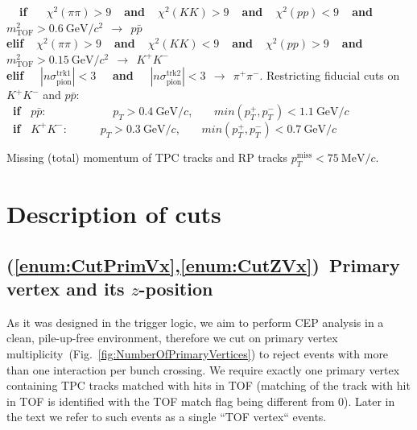 \begin{enumerate}[label=\textbf{C\arabic*},ref=C\arabic*]
\begin{enumerate}[label=\textbf{\theenumi.\arabic*},ref=\theenumi.\arabic*]
        \textbf{~~if~~~}\hspace*{4.5pt}$\chi^{2}(\pi\pi)>9$\textbf{~~and~~}$\chi^{2}(KK)>9$\textbf{~~and~~}$\chi^{2}(pp)<9$\textbf{~~and~~}$m^{2}_{\text{TOF}}>0.6~\text{GeV}/c^{2}~~\rightarrow~~p\bar{p}$\\[5pt]%
        \textbf{elif~~}$\chi^{2}(\pi\pi)>9$\textbf{~~and~~}$\chi^{2}(KK)<9$\textbf{~~and~~}$\chi^{2}(pp)>9$\textbf{~~and~~}$m^{2}_{\text{TOF}}>0.15~\text{GeV}/c^{2}~~\rightarrow~~K^{+}K^{-}$\\[5pt]%
        \textbf{elif~~} $|n\sigma_{\text{pion}}^{\text{trk1}}|<3$ \textbf{~~and~~} $|n\sigma_{\text{pion}}^{\text{trk2}}|<3~~\rightarrow~~\pi^{+}\pi^{-}$.%
      \itemm Restricting fiducial cuts on $K^{+}K^{-}$ and $p\bar{p}$:\label{enum:CutPidPtLimits}\\[2pt]
      \textbf{~if~} $p\bar{p}$:~~~~~~~~~~~~\hspace*{1.7pt}$p_{T}>0.4~\text{GeV}/c$,~~~~$min(p_{T}^{+},p_{T}^{-})<1.1~\text{GeV}/c$\\%
      \textbf{~if~} $K^{+}K^{-}$:~~~~~~$p_{T}>0.3~\text{GeV}/c$,~~~~$min(p_{T}^{+},p_{T}^{-})<0.7~\text{GeV}/c$%
\end{enumerate}
\itemm Missing (total) momentum of TPC tracks and RP tracks $p_{T}^{\text{miss}}<75~\text{MeV}/c$.\label{enum:CutMissingPt}%
 
\end{enumerate}

\section{Description of cuts}\label{sec:descriptionOfCuts}
\subsection{(\ref{enum:CutPrimVx},\ref{enum:CutZVx})~Primary vertex and its \texorpdfstring{$z$}{z}-position}
As it was designed in the trigger logic, we aim to perform CEP analysis in a clean, pile-up-free environment, therefore we cut on primary vertex multiplicity~(Fig.~\ref{fig:NumberOfPrimaryVertices}) to reject events with more than one interaction per bunch crossing. We require exactly one primary vertex containing TPC tracks matched with hits in TOF (matching of the track with hit in TOF is identified with the TOF match flag being different from 0). Later in the text we refer to such events as a single ``TOF vertex`` events.

